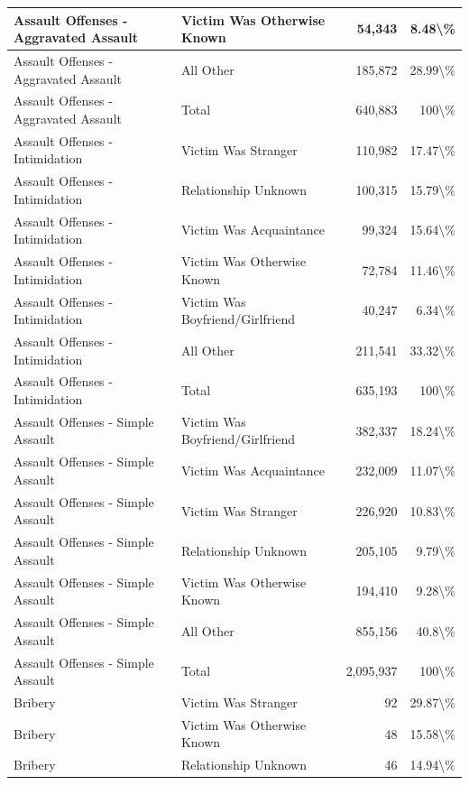 \documentclass[
]{krantz}
\begin{document}
\begin{longtable}[t]{l|l|r|r}
\hline
Assault Offenses - Aggravated Assault & Victim Was Otherwise Known & 54,343 & 8.48\textbackslash{}\%\\
\hline
Assault Offenses - Aggravated Assault & All Other & 185,872 & 28.99\textbackslash{}\%\\
\hline
Assault Offenses - Aggravated Assault & Total & 640,883 & 100\textbackslash{}\%\\
\hline
Assault Offenses - Intimidation & Victim Was Stranger & 110,982 & 17.47\textbackslash{}\%\\
\hline
Assault Offenses - Intimidation & Relationship Unknown & 100,315 & 15.79\textbackslash{}\%\\
\hline
Assault Offenses - Intimidation & Victim Was Acquaintance & 99,324 & 15.64\textbackslash{}\%\\
\hline
Assault Offenses - Intimidation & Victim Was Otherwise Known & 72,784 & 11.46\textbackslash{}\%\\
\hline
Assault Offenses - Intimidation & Victim Was Boyfriend/Girlfriend & 40,247 & 6.34\textbackslash{}\%\\
\hline
Assault Offenses - Intimidation & All Other & 211,541 & 33.32\textbackslash{}\%\\
\hline
Assault Offenses - Intimidation & Total & 635,193 & 100\textbackslash{}\%\\
\hline
Assault Offenses - Simple Assault & Victim Was Boyfriend/Girlfriend & 382,337 & 18.24\textbackslash{}\%\\
\hline
Assault Offenses - Simple Assault & Victim Was Acquaintance & 232,009 & 11.07\textbackslash{}\%\\
\hline
Assault Offenses - Simple Assault & Victim Was Stranger & 226,920 & 10.83\textbackslash{}\%\\
\hline
Assault Offenses - Simple Assault & Relationship Unknown & 205,105 & 9.79\textbackslash{}\%\\
\hline
Assault Offenses - Simple Assault & Victim Was Otherwise Known & 194,410 & 9.28\textbackslash{}\%\\
\hline
Assault Offenses - Simple Assault & All Other & 855,156 & 40.8\textbackslash{}\%\\
\hline
Assault Offenses - Simple Assault & Total & 2,095,937 & 100\textbackslash{}\%\\
\hline
Bribery & Victim Was Stranger & 92 & 29.87\textbackslash{}\%\\
\hline
Bribery & Victim Was Otherwise Known & 48 & 15.58\textbackslash{}\%\\
\hline
Bribery & Relationship Unknown & 46 & 14.94\textbackslash{}\%\\

\end{longtable}
\end{document}
